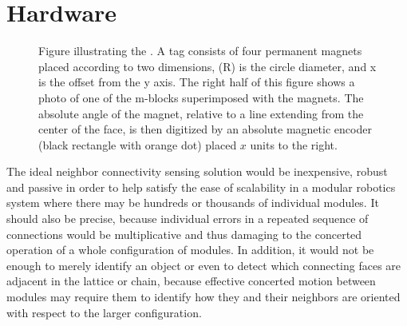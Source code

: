 \section{Hardware}
\label{sec:Hardware}

\begin{figure*}[th]
	
	
	
	\caption{Figure illustrating the \TagNamePlural. A tag consists of four permanent magnets placed according to two dimensions, (R) is the circle diameter, and x is the offset from the y axis. The right half of this figure shows a photo of one of the m-blocks superimposed with the magnets. The absolute angle of the magnet, relative to a line extending from the center of the face, is then digitized by an absolute magnetic encoder (black rectangle with orange dot) placed $x$ units to the right. }
	\label{fig:tagDiagram}
\end{figure*}
The ideal neighbor connectivity sensing solution would be inexpensive, robust and passive in order to help satisfy the ease of scalability in a modular robotics system where there may be hundreds or thousands of individual modules. It should also be precise, because individual errors in a repeated sequence of connections would be multiplicative and thus damaging to the concerted operation of a whole configuration of modules. In addition, it would not be enough to merely identify an object or even to detect which connecting faces are adjacent in the lattice or chain, because effective concerted motion between modules may require them to identify how they and their neighbors are oriented with respect to the larger configuration.

